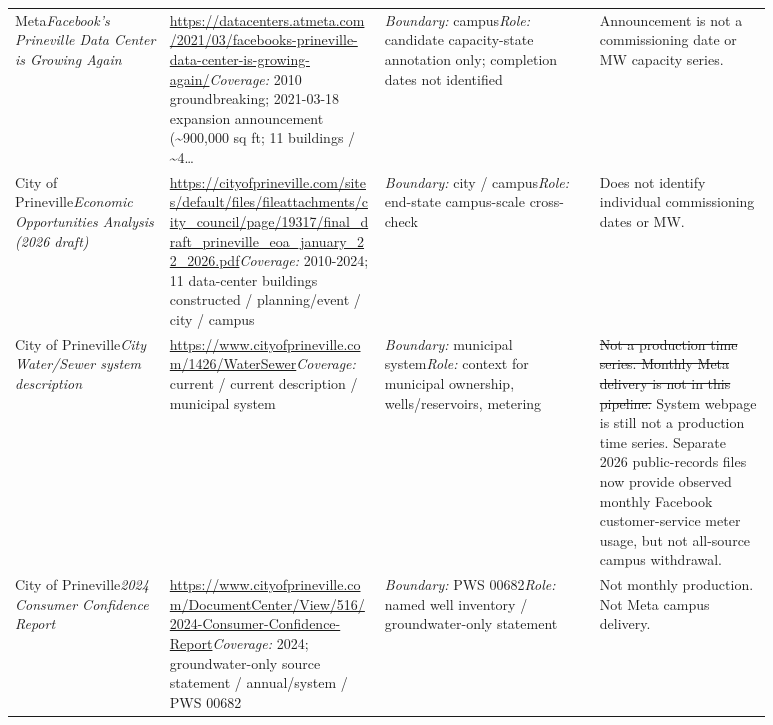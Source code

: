 \documentclass[11pt]{article}
\newcommand{\oldtxt}[1]{\textcolor{blue!70!black}{\sout{#1}}}
\newcommand{\latesttxt}[1]{\textcolor{purple!85!black}{#1}}
\begin{document}
\begin{longtable}{@{}p{0.18\linewidth}p{0.25\linewidth}p{0.25\linewidth}p{0.20\linewidth}@{}}
Meta\newline \textit{Facebook's Prineville Data Center is Growing Again} & \url{https://datacenters.atmeta.com/2021/03/facebooks-prineville-data-center-is-growing-again/}\newline \textit{Coverage:} 2010 groundbreaking; 2021-03-18 expansion announcement (\textasciitilde{}900,000 sq ft; 11 buildings / \textasciitilde{}4\ldots & \textit{Boundary:} campus\newline \textit{Role:} candidate capacity-state annotation only; completion dates not identified & Announcement is not a commissioning date or MW capacity series.\\
City of Prineville\newline \textit{Economic Opportunities Analysis (2026 draft)} & \url{https://cityofprineville.com/sites/default/files/fileattachments/city_council/page/19317/final_draft_prineville_eoa_january_22_2026.pdf}\newline \textit{Coverage:} 2010-2024; 11 data-center buildings constructed / planning/event / city / campus & \textit{Boundary:} city / campus\newline \textit{Role:} end-state campus-scale cross-check & Does not identify individual commissioning dates or MW.\\
City of Prineville\newline \textit{City Water/Sewer system description} & \url{https://www.cityofprineville.com/1426/WaterSewer}\newline \textit{Coverage:} current / current description / municipal system & \textit{Boundary:} municipal system\newline \textit{Role:} context for municipal ownership, wells/reservoirs, metering & \oldtxt{Not a production time series. Monthly Meta delivery is not in this pipeline.} \latesttxt{System webpage is still not a production time series. Separate 2026 public-records files now provide observed monthly Facebook customer-service meter usage, but not all-source campus withdrawal.}\\
City of Prineville\newline \textit{2024 Consumer Confidence Report} & \url{https://www.cityofprineville.com/DocumentCenter/View/516/2024-Consumer-Confidence-Report}\newline \textit{Coverage:} 2024; groundwater-only source statement / annual/system / PWS 00682 & \textit{Boundary:} PWS 00682\newline \textit{Role:} named well inventory / groundwater-only statement & Not monthly production. Not Meta campus delivery.\\

\end{longtable}
\end{document}
